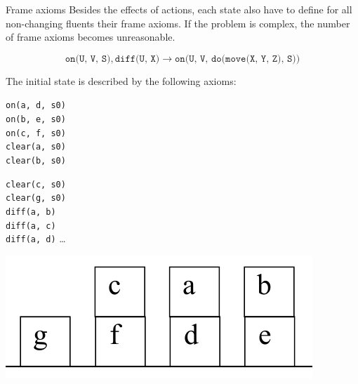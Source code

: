 \begin{descriptionlist}
    \item[Frame axioms]
        Besides the effects of actions, each state also have to define for all non-changing fluents their frame axioms.
        If the problem is complex, the number of frame axioms becomes unreasonable.
        \begin{example}
            \[ \texttt{on(U, V, S)}, \texttt{diff(U, X)} \rightarrow \texttt{on(U, V, do(move(X, Y, Z), S))} \]
        \end{example}
\end{descriptionlist}


\begin{example}
    The initial state is described by the following axioms:\\[0.5em]
    \begin{minipage}{.3\linewidth}
        \centering
        \texttt{on(a, d, s0)} \\
        \texttt{on(b, e, s0)} \\
        \texttt{on(c, f, s0)} \\
        \texttt{clear(a, s0)} \\
        \texttt{clear(b, s0)} \\
    \end{minipage}
    \begin{minipage}{.3\linewidth}
        \centering
        \texttt{clear(c, s0)} \\
        \texttt{clear(g, s0)} \\
        \texttt{diff(a, b)} \\
        \texttt{diff(a, c)} \\
        \texttt{diff(a, d)} \dots \\
    \end{minipage}
    \begin{minipage}{.3\linewidth}
        \centering
        \includegraphics[width=\linewidth]{img/_moving_block_example_green.pdf}
    \end{minipage}\\[0.5em]


\end{example}
